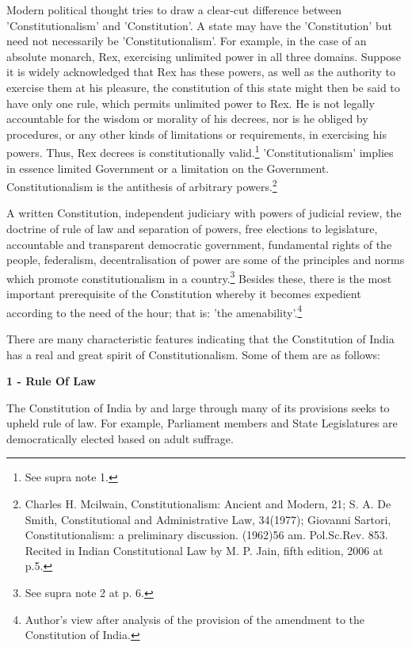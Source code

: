 \begin{multicols}{2}
\noi
Modern political thought tries to draw a clear-cut difference between 'Constitutionalism' and
'Constitution'. A state may have the 'Constitution' but need not necessarily be 'Constitutionalism'.
For example, in the case of an absolute monarch, Rex, exercising unlimited power in all three
domains. Suppose it is widely acknowledged that Rex has these powers, as well as the authority
to exercise them at his pleasure, the constitution of this state might then be said to have only one
rule, which permits unlimited power to Rex. He is not legally accountable for the wisdom or
morality of his decrees, nor is he obliged by procedures, or any other kinds of limitations or
requirements, in exercising his powers. Thus, Rex decrees is constitutionally valid.\footnote{See supra note 1.} 'Constitutionalism' implies in essence limited Government or a limitation on the Government.
Constitutionalism is the antithesis of arbitrary powers.\footnote{Charles H. Mcilwain, Constitutionalism: Ancient and Modern, 21; S. A. De Smith, Constitutional and Administrative Law, 34(1977); Giovanni Sartori, Constitutionalism: a preliminary discussion. (1962)56 am. Pol.Sc.Rev. 853. Recited in Indian Constitutional Law by M. P. Jain, fifth edition, 2006 at p.5.}


\noi
A written Constitution, independent judiciary with powers of judicial review, the doctrine of rule
of law and separation of powers, free elections to legislature, accountable and transparent
democratic government, fundamental rights of the people, federalism, decentralisation of power
are some of the principles and norms which promote constitutionalism in a country.\footnote{See supra note 2 at p. 6.} Besides these, there is the most important prerequisite of the Constitution whereby it becomes expedient according to the need of the hour; that is: 'the amenability'.\footnote{Author's view after analysis of the provision of the amendment to the Constitution of India.}

\noi
There are many characteristic features indicating that the Constitution of India has a real and great
spirit of Constitutionalism. Some of them are as follows:

\vspace{-.1cm}

\noi
{\large \bfseries 1 - Rule Of Law}

\noi
The Constitution of India by and large through many of its provisions seeks to upheld rule of law.
For example, Parliament members and State Legislatures are democratically elected based on
adult suffrage.


\end{multicols}
